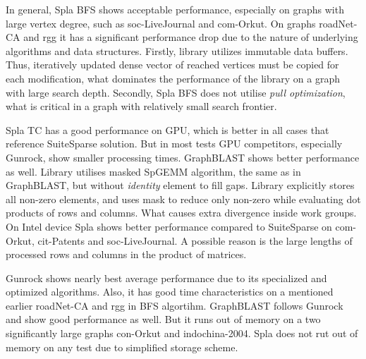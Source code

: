 In general, Spla BFS shows acceptable performance, especially on graphs with large vertex degree, such as soc-LiveJournal and com-Orkut.
On graphs roadNet-CA and rgg it has a significant performance drop due to the nature of underlying algorithms and data structures. 
Firstly, library utilizes immutable data buffers. Thus, iteratively updated dense vector of reached vertices must be copied for each modification, what dominates the performance of the library on a graph with large search depth. 
Secondly, Spla BFS does not utilise \textit{pull optimization}, what is critical in a graph with relatively small search frontier. 

Spla TC has a good performance on GPU, which is better in all cases that reference SuiteSparse solution. 
But in most tests GPU competitors, especially Gunrock, show smaller processing times. 
GraphBLAST shows better performance as well. 
Library utilises masked SpGEMM algorithm, the same as in GraphBLAST, but without \textit{identity} element to fill gaps. 
Library explicitly stores all non-zero elements, and uses mask to reduce only non-zero while evaluating dot products of rows and columns. 
What causes extra divergence inside work groups. 
On Intel device Spla shows better performance compared to SuiteSparse on com-Orkut, cit-Patents and soc-LiveJournal. 
A possible reason is the large lengths of processed rows and columns in the product of matrices.

Gunrock shows nearly best average performance due to its specialized and optimized algorithms.
Also, it has good time characteristics on a mentioned earlier roadNet-CA and rgg in BFS algortihm. 
GraphBLAST follows Gunrock and show good performance as well. 
But it runs out of memory on a two significantly large graphs con-Orkut and indochina-2004. 
Spla does not rut out of memory on any test due to simplified storage scheme.

